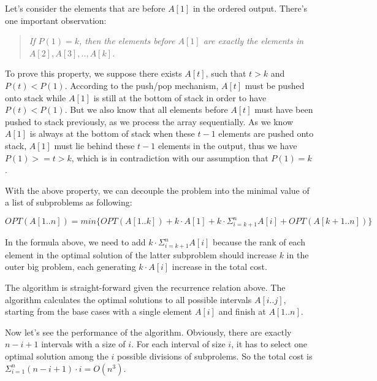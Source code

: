 Let's consider the elements that are before $A[1]$ in the ordered output. There's one important observation:

\begin{quote}
\textit{If $P(1) = k$, then the elements before $A[1]$ are exactly the elements in $A[2], A[3], .., A[k]$.}
\end{quote}

To prove this property, we suppose there exists $A[t]$, such that $t > k$ and $P(t) < P(1)$. According to the push/pop mechanism, $A[t]$ must be pushed onto stack while $A[1]$ is still at the bottom of stack in order to have $P(t) < P(1)$. But we also know that all elements before $A[t]$ must have been pushed to stack previously, as we process the array sequentially. As we know $A[1]$ is always at the bottom of stack when these $t - 1$ elements are pushed onto stack, $A[1]$ must lie behind these $t - 1$ elements in the output, thus we have $P(1) >= t > k$, which is in contradiction with our assumption that $P(1) = k$.

With the above property, we can decouple the problem into the minimal value of a list of subproblems as following:

\[
OPT(A[1..n]) = min \{ OPT(A[1..k]) + k \cdot A[1] + k \cdot \Sigma_{i = k + 1}^{n}A[i] + OPT(A[k+1..n]) \}
\]

In the formula above, we need to add $k \cdot \Sigma_{i = k + 1}^{n}A[i]$ because the rank of each element in the optimal solution of the latter subproblem should increase $k$ in the outer big problem, each generating $k\cdot A[i]$ increase in the total cost.

The algorithm is straight-forward given the recurrence relation above. The algorithm calculates the optimal solutions to all possible intervals $A[i..j]$, starting from the base cases with a single element $A[i]$ and finish at $A[1..n]$.

Now let's see the performance of the algorithm. Obviously, there are exactly $n - i + 1$ intervals with a size of $i$. For each interval of size $i$, it has to select one optimal solution among the $i$ possible divisions of subprolems. So the total cost is $\Sigma_{i=1}^{n} (n - i + 1) \cdot i = O(n^3)$.